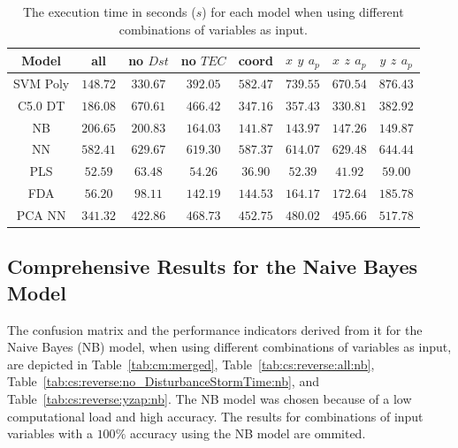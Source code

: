 \documentclass[sn-mathphys-num]{sn-jnl}%
\begin{document}
\begin{table}[!ht]
	\centering
    \caption{The execution time in seconds ($s$) for each model when using different combinations of variables as input.}
	\label{tab:time:total}
	\begin{tabular}{|c|c|c|c|c|c|c|c|}
		\hline
		Model & all & no $Dst$ & no $TEC$ & coord & $x$ $y$ $a_{p}$ & $x$ $z$ $a_{p}$ & $y$ $z$ $a_{p}$ \\ \hline
		SVM Poly & $148.72$ & $330.67$ & $392.05$ & $582.47$ & $739.55$ & $670.54$ & $876.43$ \\ \hline
		C5.0 DT & $186.08$ & $670.61$ & $466.42$ & $347.16$ & $357.43$ & $330.81$ & $382.92$ \\ \hline
		NB & $206.65$ & $200.83$ & $164.03$ & $141.87$ & $143.97$ & $147.26$ & $149.87$ \\ \hline
		NN & $582.41$ & $629.67$ & $619.30$ & $587.37$ & $614.07$ & $629.48$ & $644.44$ \\ \hline
		PLS & $52.59$ & $63.48$ & $54.26$ & $36.90$ & $52.39$ & $41.92$ & $59.00$ \\ \hline
		FDA & $56.20$ & $98.11$ & $142.19$ & $144.53$ & $164.17$ & $172.64$ & $185.78$ \\ \hline
		PCA NN & $341.32$ & $422.86$ & $468.73$ & $452.75$ & $480.02$ & $495.66$ & $517.78$ \\ \hline
	\end{tabular}
\end{table}

\subsection{Comprehensive Results for the Naive Bayes Model}

The confusion matrix and the performance indicators derived from it for the Naive Bayes (NB) model, when using different combinations of variables as input, are depicted in Table~\ref{tab:cm:merged}, Table~\ref{tab:cs:reverse:all:nb}, Table~\ref{tab:cs:reverse:no_DisturbanceStormTime:nb}, and Table~\ref{tab:cs:reverse:yzap:nb}. The NB model was chosen because of a low computational load and high accuracy. The results for combinations of input variables with a $100\%$ accuracy using the NB model are ommited.
\end{document}
